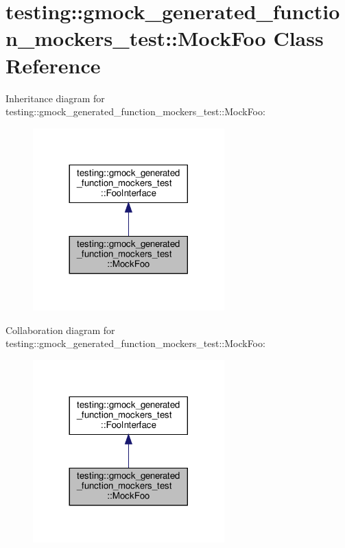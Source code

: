 \hypertarget{classtesting_1_1gmock__generated__function__mockers__test_1_1_mock_foo}{}\section{testing\+:\+:gmock\+\_\+generated\+\_\+function\+\_\+mockers\+\_\+test\+:\+:Mock\+Foo Class Reference}
\label{classtesting_1_1gmock__generated__function__mockers__test_1_1_mock_foo}


Inheritance diagram for testing\+:\+:gmock\+\_\+generated\+\_\+function\+\_\+mockers\+\_\+test\+:\+:Mock\+Foo\+:
\nopagebreak
\begin{figure}[H]
\begin{center}
\leavevmode
\includegraphics[width=209pt]{classtesting_1_1gmock__generated__function__mockers__test_1_1_mock_foo__inherit__graph}
\end{center}
\end{figure}


Collaboration diagram for testing\+:\+:gmock\+\_\+generated\+\_\+function\+\_\+mockers\+\_\+test\+:\+:Mock\+Foo\+:
\nopagebreak
\begin{figure}[H]
\begin{center}
\leavevmode
\includegraphics[width=209pt]{classtesting_1_1gmock__generated__function__mockers__test_1_1_mock_foo__coll__graph}
\end{center}
\end{figure}
